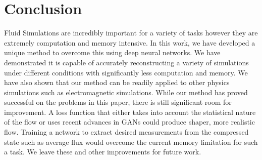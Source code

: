 \documentclass{article}
\begin{document}
\section{Conclusion}

Fluid Simulations are incredibly important for a variety of tasks however they are extremely computation and memory intensive. In this work, we have developed a unique method to overcome this using deep neural networks. We have demonstrated it is capable of accurately reconstructing a variety of simulations under different conditions with significantly less computation and memory. We have also shown that our method can be readily applied to other physics simulations such as electromagnetic simulations. While our method has proved successful on the problems in this paper, there is still significant room for improvement. A loss function that either takes into account the statistical nature of the flow or uses recent advances in GANs could produce shaper, more realistic flow. Training a network to extract desired measurements from the compressed state such as average flux would overcome the current memory limitation for such a task. We leave these and other improvements for future work.



\end{document}

